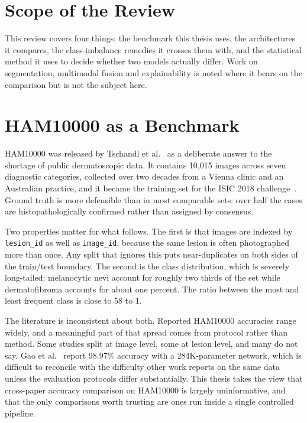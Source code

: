 \section{Scope of the Review}

This review covers four things: the benchmark this thesis uses, the architectures it
compares, the class-imbalance remedies it crosses them with, and the statistical method
it uses to decide whether two models actually differ. Work on segmentation, multimodal
fusion and explainability is noted where it bears on the comparison but is not the
subject here.

\section{HAM10000 as a Benchmark}
\label{sec:lit-ham}

HAM10000 was released by Tschandl et al.~\cite{tschandl2018ham10000} as a deliberate
answer to the shortage of public dermatoscopic data. It contains 10{,}015 images across
seven diagnostic categories, collected over two decades from a Vienna clinic and an
Australian practice, and it became the training set for the ISIC 2018
challenge~\cite{codella2019isic}. Ground truth is more defensible than in most
comparable sets: over half the cases are histopathologically confirmed rather than
assigned by consensus.

Two properties matter for what follows. The first is that images are indexed by
\texttt{lesion\_id} as well as \texttt{image\_id}, because the same lesion is often
photographed more than once. Any split that ignores this puts near-duplicates on both
sides of the train/test boundary. The second is the class distribution, which is
severely long-tailed: melanocytic nevi account for roughly two thirds of the set while
dermatofibroma accounts for about one percent. The ratio between the most and least
frequent class is close to 58 to 1.

The literature is inconsistent about both. Reported HAM10000 accuracies range widely,
and a meaningful part of that spread comes from protocol rather than method. Some studies
split at image level, some at lesion level, and many do not say. Gao et
al.~\cite{gao2024skinlitenet} report 98.97\% accuracy with a 284K-parameter network,
which is difficult to reconcile with the difficulty other work reports on the same data
unless the evaluation protocols differ substantially. This thesis takes the view that
cross-paper accuracy comparison on HAM10000 is largely uninformative, and that the only
comparisons worth trusting are ones run inside a single controlled pipeline.

